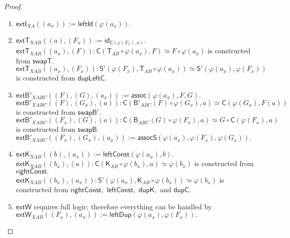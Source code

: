 \documentclass[a4paper]{article}
\theoremstyle{definition}
\theoremstyle{remark}
\renewcommand{\phi}{\varphi}
\renewcommand{\equiv}{\simeq}
\newcommand{\nm}{\mathsf}
\newcommand{\id}{\nm{id}}
\newcommand{\combinator}{\nm}
\newcommand{\revAppFun}{\combinator{T}}
\newcommand{\constFun}{\combinator{K}}
\newcommand{\compFun}{\combinator{B'}}
\newcommand{\revCompFun}{\combinator{B}}
\newcommand{\swapFun}{\combinator{C}}
\newcommand{\substFun}{\combinator{S'}}
\newcommand{\leftId}{\nm{leftId}}
\newcommand{\swapRevApp}{\nm{swapT}}
\newcommand{\swapCompFun}{\nm{swapB'}}
\newcommand{\swapRevCompFun}{\nm{swapB}}
\newcommand{\compAssoc}{\nm{assoc}}
\newcommand{\rightConst}{\nm{rightConst}}
\newcommand{\leftConst}{\nm{leftConst}}
\newcommand{\dupSwap}{\nm{dupC}}
\newcommand{\dupConst}{\nm{dupK}}
\newcommand{\substDup}{\nm{leftDup}}
\newcommand{\substAltDef}{\nm{dupLeftC}}
\newcommand{\substAssoc}{\nm{assocS}}
\newcommand{\idFunExt}{\nm{extI}}
\newcommand{\revAppFunExt}{\nm{extT}}
\newcommand{\compFunExt}{\nm{extB'}}
\newcommand{\constFunExt}{\nm{extK}}
\newcommand{\dupFunExt}{\nm{extW}}
\begin{document}
\begin{proof}
  \begin{enumerate}
    \item $\idFunExt_{XA}((a_x)) := \leftId(\phi(a_x)).$
    \item $\revAppFunExt_{XAB}((a),(F_x)) := \id_{\swapFun(\phi(F_x),a)}.$\\
    $\revAppFunExt_{XAB}((a_x),(F)) : \swapFun(\revAppFun_{AB} \circ \phi(a_x),F) \equiv F \circ \phi(a_x)$
    is constructed from $\swapRevApp.$\\
    $\revAppFunExt_{XAB}((a_x),(F_x)) : \substFun(\phi(F_x),\revAppFun_{AB} \circ \phi(a_x)) \equiv \substFun(\phi(a_x),\phi(F_x))$
    is constructed from $\substAltDef.$
    \item $\compFunExt_{XABC}((F),(G),(a_x)) := \compAssoc(\phi(a_x),F,G).$\\
    $\compFunExt_{XABC}((F),(G_x),(a)) : \swapFun(\compFun_{ABC}(F) \circ \phi(G_x),a) \equiv \swapFun(\phi(G_x),F(a))$
    is constructed from $\swapCompFun.$\\
    $\compFunExt_{XABC}((F_x),(G),(a)) : \swapFun(\revCompFun_{ABC}(G) \circ \phi(F_x),a) \equiv G \circ \swapFun(\phi(F_x),a)$
    is constructed from $\swapRevCompFun.$\\
    $\compFunExt_{XABC}((F_x),(G_x),(a_x)) := \substAssoc(\phi(a_x),\phi(F_x),\phi(G_x)).$
    \item $\constFunExt_{XAB}((b),(a_x)) := \leftConst(\phi(a_x),b).$\\
    $\constFunExt_{XAB}((b_x),(a)) : \swapFun(\constFun_{AB} \circ \phi(b_x),a) \equiv \phi(b_x)$
    is constructed from $\rightConst.$\\
    $\constFunExt_{XAB}((b_x),(a_x)) : \substFun(\phi(a_x),\constFun_{AB} \circ \phi(b_x)) \equiv \phi(b_x)$
    is constructed from $\rightConst,$ $\leftConst,$ $\dupConst,$ and $\dupSwap.$
    \item $\dupFunExt$ requires full logic; therefore everything can be handled by\\
    $\dupFunExt_{XAB}((F_x),(a_x)) := \substDup(\phi(a_x),\phi(F_x)).$
    \qedhere
  \end{enumerate}
\end{proof}
\end{document}
